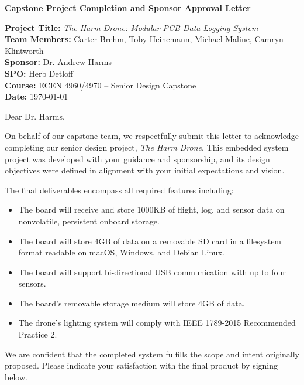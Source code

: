 \documentclass[11pt]{letter}
\begin{document}
\begin{center}
    \large \textbf{Capstone Project Completion and Sponsor Approval Letter}
\end{center}

\vspace{1em}

\noindent\textbf{Project Title:} \textit{The Harm Drone: Modular PCB Data Logging System} \\
\textbf{Team Members:} Carter Brehm, Toby Heinemann, Michael Maline, Camryn Klintworth \\
\textbf{Sponsor:} Dr. Andrew Harms \\
\textbf{SPO:} Herb Detloff \\
\textbf{Course:} ECEN 4960/4970 – Senior Design Capstone \\
\textbf{Date:} \today

\vspace{1.5em}

\noindent Dear Dr. Harms,

\vspace{1em}

On behalf of our capstone team, we respectfully submit this letter to acknowledge completing our senior design project, \textit{The Harm Drone}. This embedded system project was developed with your guidance and sponsorship, and its design objectives were defined in alignment with your initial expectations and vision.

The final deliverables encompass all required features including:
\begin{itemize}
   \item The board will receive and store 1000KB of flight, log, and sensor data on nonvolatile, persistent onboard storage. 
    \item The board will store 4GB of data on a removable SD card in a filesystem format readable on macOS, Windows, and Debian Linux. 
    \item The board will support bi-directional USB communication with up to four sensors.
    \item The board’s removable storage medium will store 4GB of data.
    \item The drone’s lighting system will comply with IEEE 1789-2015 Recommended Practice 2.
\end{itemize}

We are confident that the completed system fulfills the scope and intent originally proposed. Please indicate your satisfaction with the final product by signing below.
\end{document}
